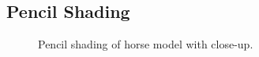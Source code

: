   \subsection{Pencil Shading}
    \begin{figure}
      \centering



      \caption{Pencil shading of horse model with close-up.}
      \label{pencil1}
    \end{figure}

